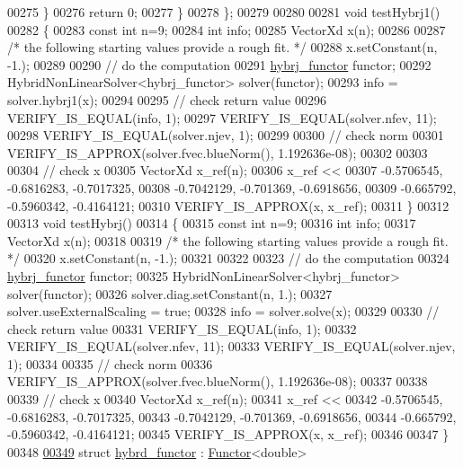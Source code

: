 \begin{DoxyCode}
00275         \}
00276         \textcolor{keywordflow}{return} 0;
00277     \}
00278 \};
00279 
00280 
00281 \textcolor{keywordtype}{void} testHybrj1()
00282 \{
00283   \textcolor{keyword}{const} \textcolor{keywordtype}{int} n=9;
00284   \textcolor{keywordtype}{int} info;
00285   VectorXd x(n);
00286 
00287   \textcolor{comment}{/* the following starting values provide a rough fit. */}
00288   x.setConstant(n, -1.);
00289 
00290   \textcolor{comment}{// do the computation}
00291   \hyperlink{structhybrj__functor}{hybrj\_functor} functor;
00292   HybridNonLinearSolver<hybrj\_functor> solver(functor);
00293   info = solver.hybrj1(x);
00294 
00295   \textcolor{comment}{// check return value}
00296   VERIFY\_IS\_EQUAL(info, 1);
00297   VERIFY\_IS\_EQUAL(solver.nfev, 11);
00298   VERIFY\_IS\_EQUAL(solver.njev, 1);
00299 
00300   \textcolor{comment}{// check norm}
00301   VERIFY\_IS\_APPROX(solver.fvec.blueNorm(), 1.192636e-08);
00302 
00303 
00304 \textcolor{comment}{// check x}
00305   VectorXd x\_ref(n);
00306   x\_ref <<
00307      -0.5706545,    -0.6816283,    -0.7017325,
00308      -0.7042129,     -0.701369,    -0.6918656,
00309      -0.665792,    -0.5960342,    -0.4164121;
00310   VERIFY\_IS\_APPROX(x, x\_ref);
00311 \}
00312 
00313 \textcolor{keywordtype}{void} testHybrj()
00314 \{
00315   \textcolor{keyword}{const} \textcolor{keywordtype}{int} n=9;
00316   \textcolor{keywordtype}{int} info;
00317   VectorXd x(n);
00318 
00319   \textcolor{comment}{/* the following starting values provide a rough fit. */}
00320   x.setConstant(n, -1.);
00321 
00322 
00323   \textcolor{comment}{// do the computation}
00324   \hyperlink{structhybrj__functor}{hybrj\_functor} functor;
00325   HybridNonLinearSolver<hybrj\_functor> solver(functor);
00326   solver.diag.setConstant(n, 1.);
00327   solver.useExternalScaling = \textcolor{keyword}{true};
00328   info = solver.solve(x);
00329 
00330   \textcolor{comment}{// check return value}
00331   VERIFY\_IS\_EQUAL(info, 1);
00332   VERIFY\_IS\_EQUAL(solver.nfev, 11);
00333   VERIFY\_IS\_EQUAL(solver.njev, 1);
00334 
00335   \textcolor{comment}{// check norm}
00336   VERIFY\_IS\_APPROX(solver.fvec.blueNorm(), 1.192636e-08);
00337 
00338 
00339 \textcolor{comment}{// check x}
00340   VectorXd x\_ref(n);
00341   x\_ref <<
00342      -0.5706545,    -0.6816283,    -0.7017325,
00343      -0.7042129,     -0.701369,    -0.6918656,
00344      -0.665792,    -0.5960342,    -0.4164121;
00345   VERIFY\_IS\_APPROX(x, x\_ref);
00346 
00347 \}
00348 
\hyperlink{structhybrd__functor}{00349} \textcolor{keyword}{struct }\hyperlink{structhybrd__functor}{hybrd\_functor} : \hyperlink{struct_functor}{Functor}<double>

\end{DoxyCode}
